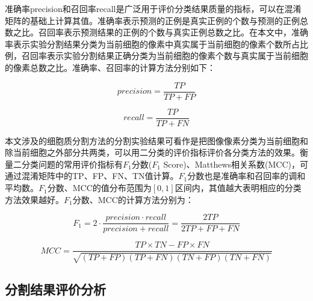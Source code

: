 \documentclass[nomlist,masters]{seuthesix}
\begin{document}
准确率precision和召回率recall是广泛用于评价分类结果质量的指标，可以在混淆矩阵的基础上计算其值。准确率表示预测的正例是真实正例的个数与预测的正例总数之比。召回率表示预测结果的正例的个数与真实正例总数之比。在本文中，准确率表示实验分割结果分类为当前细胞的像素中真实属于当前细胞的像素个数所占比例，召回率表示实验分割结果正确分类为当前细胞的像素个数与真实属于当前细胞的像素总数之比。准确率、召回率的计算方法分别如下：

\begin{equation}
precision=\frac{TP}{TP+FP}
\label{precision}
\end{equation}

\begin{equation}
recall=\frac{TP}{TP+FN}
\label{recall}
\end{equation}

本文涉及的细胞质分割方法的分割实验结果可看作是把图像像素分类为当前细胞和除当前细胞之外部分共两类，可以用二分类的评价指标评价各分类方法的效果。衡量二分类问题的常用评价指标有$F_{1}$分数($F_{1}$ Score)、Matthews相关系数(MCC)，可通过混淆矩阵中的TP、FP、FN、TN值计算。$F_{1}$分数也是准确率和召回率的调和平均数。$F_{1}$分数、MCC的值分布范围为$[0,1]$区间内，其值越大表明相应的分类方法效果越好。$F_{1}$分数、MCC的计算方法分别为：

\begin{equation}
F_{1}=2\cdot \frac{precision\cdot recall}{precision+recall}=\frac{2TP}{2TP+FP+FN}
\label{F1}
\end{equation}

\begin{equation}
MCC=\frac{TP\times TN-FP\times FN}{\sqrt{(TP+FP)(TP+FN)(TN+FP)(TN+FN)}}
\label{MCC}
\end{equation}

\subsection{分割结果评价分析}
\end{document}
